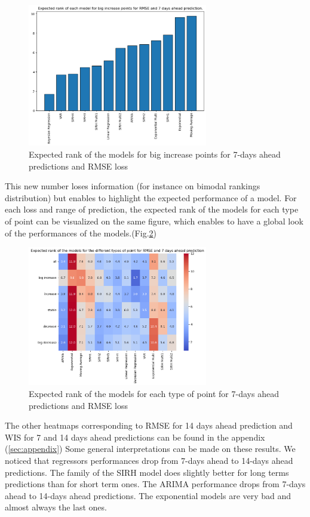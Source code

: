 \begin{figure}[h]
    \centering
    \includegraphics[width=0.7\textwidth]{figures/expected_ranks_big_increase_RMSE_7.png}
    \caption{Expected rank of the models for big increase points for 7-days ahead predictions and RMSE loss}
    \label{fig:expected_rank}
\end{figure}
This new number loses information (for instance on bimodal rankings distribution) but enables to highlight the expected performance of a model. 
For each loss and range of prediction, the expected rank of the models for each type of point can be visualized on the same figure, which enables to have a global look of the performances of the models.(Fig.\ref{fig:heatmap_RMSE_7}) 
\begin{figure}[h]
    \centering
    \includegraphics[width=0.7\textwidth]{figures/heatmap_RMSE_7.png}
    \caption{Expected rank of the models for each type of point for 7-days ahead predictions and RMSE loss}
    \label{fig:heatmap_RMSE_7}
\end{figure}


The other heatmaps corresponding to RMSE for 14 days ahead prediction and WIS for 7 and 14 days ahead predictions can be found in the appendix (\ref{sec:appendix})
Some general interpretations can be made on these results. 
We noticed that regressors performances drop from 7-days ahead to 14-days ahead predictions. 
The family of the SIRH model does slightly better for long terms predictions than for short term ones. 
The ARIMA performance drops from 7-days ahead to 14-days ahead predictions. 
The exponential models are very bad and almost always the last ones. 

